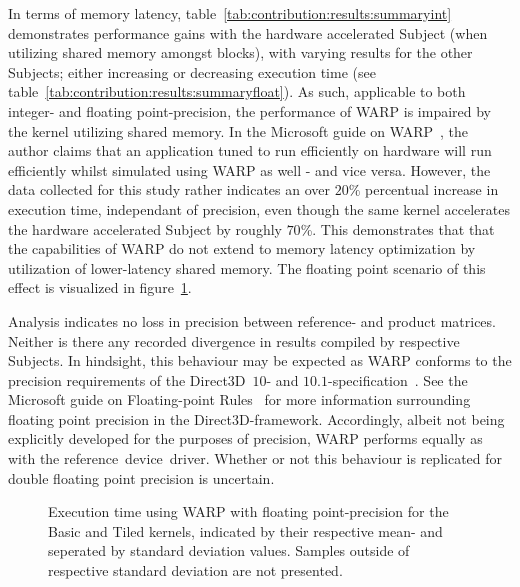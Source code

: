 In terms of memory latency, table~\ref{tab:contribution:results:summaryint} demonstrates performance gains with the hardware accelerated Subject (when utilizing shared memory amongst blocks), with varying results for the other Subjects; either increasing or decreasing execution time (see table~\ref{tab:contribution:results:summaryfloat}).
As such, applicable to both integer- and floating point-precision, the performance of WARP is impaired by the kernel utilizing shared memory.
In the Microsoft guide on WARP~, the author claims that an application tuned to run efficiently on hardware will run efficiently whilst simulated using WARP as well - and vice versa.
However, the data collected for this study rather indicates an over $20\%$ percentual increase in execution time, independant of precision, even though the same kernel accelerates the hardware accelerated Subject by roughly $70$\%.
This demonstrates that that the capabilities of WARP do not extend to memory latency optimization by utilization of lower-latency shared memory.
The floating point scenario of this effect is visualized in figure~\ref{fig:contribution:results:warp:msswarp}.

Analysis indicates no loss in precision between reference- and product matrices.
Neither is there any recorded divergence in results compiled by respective Subjects.
In hindsight, this behaviour may be expected as WARP conforms to the precision requirements of the Direct3D~$10$- and $10.1$-specification~.
See the Microsoft guide on Floating-point Rules~ for more information surrounding floating point precision in the Direct3D-framework.
Accordingly, albeit not being explicitly developed for the purposes of precision, WARP performs equally as with the reference~device~driver.
Whether or not this behaviour is replicated for double floating point precision is uncertain.

\begin{figure}[htb]
\begin{center}
	\resizebox{ \columnwidth }{!}{}
	\caption{Execution time using WARP with floating point-precision for the Basic and Tiled kernels, indicated by their respective mean- and seperated by standard deviation values. Samples outside of respective standard deviation are not presented.}
	\label{fig:contribution:results:warp:msswarp}
\end{center}
\end{figure}
